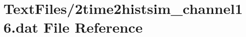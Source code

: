 \hypertarget{2time2histsim__channel16_8dat}{}\section{Text\+Files/2time2histsim\+\_\+channel16.dat File Reference}
\label{2time2histsim__channel16_8dat}
